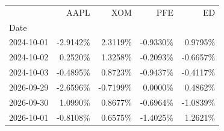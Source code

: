 \begin{tabular}{lrrrr}
\toprule
 & AAPL & XOM & PFE & ED \\
Date &  &  &  &  \\
\midrule
2024-10-01 & -2.9142\% & 2.3119\% & -0.9330\% & 0.9795\% \\
2024-10-02 & 0.2520\% & 1.3258\% & -0.2093\% & -0.6657\% \\
2024-10-03 & -0.4895\% & 0.8723\% & -0.9437\% & -0.4117\% \\
2026-09-29 & -2.6596\% & -0.7199\% & 0.0000\% & 0.4862\% \\
2026-09-30 & 1.0990\% & 0.8677\% & -0.6964\% & -1.0839\% \\
2026-10-01 & -0.8108\% & 0.6575\% & -1.4025\% & 1.2621\% \\
\bottomrule
\end{tabular}
